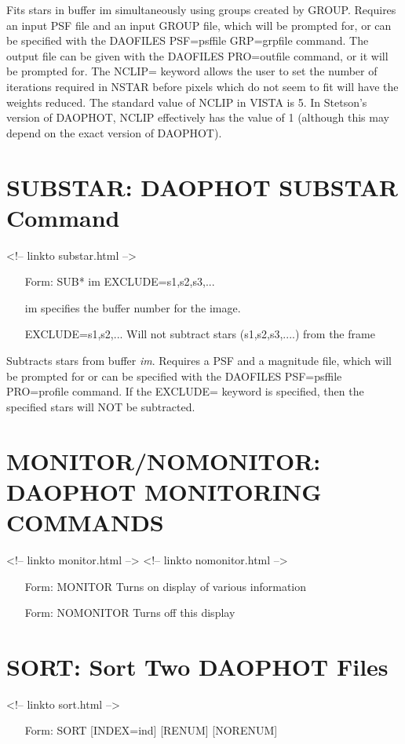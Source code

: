 Fits stars in buffer im simultaneously using groups created by GROUP.
Requires an input PSF file and an input GROUP file, which will be prompted
for, or can be specified with the DAOFILES PSF=psffile GRP=grpfile
command. The output file can be given with the DAOFILES PRO=outfile
command, or it will be prompted for. The NCLIP= keyword allows the user to
set the number of iterations required in NSTAR before pixels which do not
seem to fit will have the weights reduced.  The standard value of NCLIP in
VISTA is 5. In Stetson's version of DAOPHOT, NCLIP effectively has the
value of 1 (although this may depend on the exact version of DAOPHOT).

\section{SUBSTAR: DAOPHOT SUBSTAR Command}
\begin{rawhtml}
<!-- linkto substar.html -->
\end{rawhtml}
\begin{itemize}
  \item[Form: SUB* im EXCLUDE=s1,s2,s3,...\hfill]{}
  \item[im]{specifies the buffer number for the image.}
  \item[EXCLUDE=s1,s2,... ]{  Will not subtract stars (s1,s2,s3,....) from
    the frame}
\end{itemize}

Subtracts stars from buffer \textit{im}. Requires
a PSF and a magnitude file, which will be prompted for or can be specified
with the DAOFILES PSF=psffile PRO=profile command. If the EXCLUDE= keyword
is specified, then the specified stars will NOT be subtracted.

\section{MONITOR/NOMONITOR: DAOPHOT MONITORING COMMANDS}
\begin{rawhtml}
<!-- linkto monitor.html -->
<!-- linkto nomonitor.html -->
\end{rawhtml}
\begin{itemize}
  \item[Form: MONITOR\hfill]{Turns on display of various information}
  \item[Form: NOMONITOR\hfill]{Turns off this display}
\end{itemize}

\section{SORT: Sort Two DAOPHOT Files}
\begin{rawhtml}
<!-- linkto sort.html -->
\end{rawhtml}
\begin{itemize}
  \item[Form: SORT {[INDEX=ind]} {[RENUM]} {[NORENUM]}\hfill]{}
\end{itemize}

